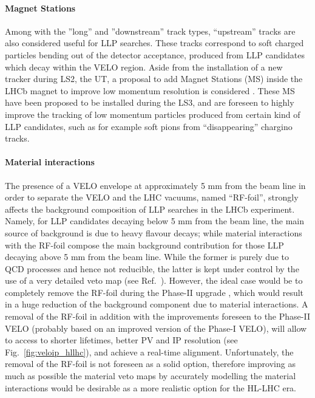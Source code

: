 \paragraph{Magnet Stations}
Among with the ''long'' and ''downstream'' track types, ``upstream'' tracks are also considered useful for LLP searches. These tracks correspond to soft charged particles bending out of the detector acceptance, produced from LLP candidates which decay within the VELO region. Aside from the installation of a new tracker during LS2, the UT, a proposal to add Magnet Stations (MS) inside the LHCb magnet to improve low momentum resolution is considered \cite{Aaij:2244311}. These MS have been proposed to be installed during the LS3, and are foreseen to highly improve the tracking of low momentum particles produced from certain kind of LLP candidates, such as for example soft pions from ``disappearing'' chargino tracks.

\paragraph{Material interactions}
The presence of a VELO envelope at approximately 5 mm from the beam line in order to separate the VELO and the LHC vacuums, named ``RF-foil'', strongly affects the background composition of LLP searches in the LHCb experiment. Namely, for LLP candidates decaying below 5 mm from the beam line, the main source of background is due to heavy flavour decays; while material interactions with the RF-foil compose the main background contribution for those LLP decaying above 5 mm from the beam line. While the former is purely due to QCD processes and hence not reducible, the latter is kept under control by the use of a very detailed veto map (see Ref.~\cite{Aaij:2017rft}). However, the ideal case would be to completely remove the RF-foil during the Phase-II upgrade \cite{Aaij:2244311}, which would result in a huge reduction of the background component due to material interactions. A removal of the RF-foil in addition with the  improvements foreseen to the Phase-II VELO (probably based on an improved version of the Phase-I VELO), will allow to access to shorter lifetimes, better PV and IP resolution (see Fig.~\ref{fig:veloip_hllhc}), and achieve a real-time alignment. Unfortunately, the removal of the RF-foil is not foreseen as a solid option, therefore improving as much as possible the material veto maps by accurately modelling the material interactions would be desirable as a more realistic option for the HL-LHC era. 

